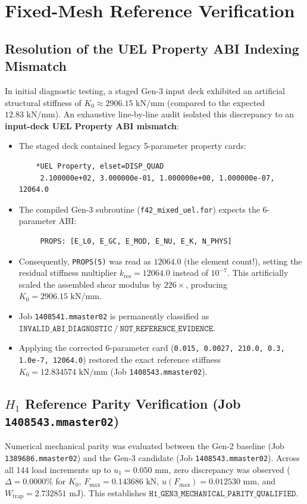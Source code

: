 \documentclass[11pt,a4paper]{article}
\begin{document}
\section{Fixed-Mesh Reference Verification}

\subsection{Resolution of the UEL Property ABI Indexing Mismatch}
In initial diagnostic testing, a staged Gen-3 input deck exhibited an artificial structural stiffness of $K_0 \approx 2906.15\text{ kN/mm}$ (compared to the expected $12.83\text{ kN/mm}$). An exhaustive line-by-line audit isolated this discrepancy to an \textbf{input-deck UEL Property ABI mismatch}:
\begin{itemize}[leftmargin=*]
    \item The staged deck contained legacy 5-parameter property cards:
    \begin{verbatim}
    *UEL Property, elset=DISP_QUAD
     2.100000e+02, 3.000000e-01, 1.000000e+00, 1.000000e-07, 12064.0
    \end{verbatim}
    \item The compiled Gen-3 subroutine (\texttt{f42\_mixed\_uel.for}) expects the 6-parameter ABI:
    \begin{verbatim}
     PROPS: [E_L0, E_GC, E_MOD, E_NU, E_K, N_PHYS]
    \end{verbatim}
    \item Consequently, \texttt{PROPS(5)} was read as $12064.0$ (the element count!), setting the residual stiffness multiplier $k_{\mathrm{res}} = 12064.0$ instead of $10^{-7}$. This artificially scaled the assembled shear modulus by $226\times$, producing $K_0 = 2906.15\text{ kN/mm}$.
    \item Job \texttt{1408541.mmaster02} is permanently classified as $\mathtt{INVALID\_ABI\_DIAGNOSTIC\ /\ NOT\_REFERENCE\_EVIDENCE}$.
    \item Applying the corrected 6-parameter card (\texttt{0.015, 0.0027, 210.0, 0.3, 1.0e-7, 12064.0}) restored the exact reference stiffness $K_0 = 12.834574\text{ kN/mm}$ (Job \texttt{1408543.mmaster02}).
\end{itemize}

\subsection{\texorpdfstring{$H_1$}{H1} Reference Parity Verification (Job \texttt{1408543.mmaster02})}
Numerical mechanical parity was evaluated between the Gen-2 baseline (Job \texttt{1389686.mmaster02}) and the Gen-3 candidate (Job \texttt{1408543.mmaster02}). Across all 144 load increments up to $u_1 = 0.050\text{ mm}$, zero discrepancy was observed ($\Delta = 0.0000\%$ for $K_0$, $F_{\max} = 0.143686\text{ kN}$, $u(F_{\max}) = 0.012530\text{ mm}$, and $W_{\mathrm{trap}} = 2.732851\text{ mJ}$). This establishes $\mathtt{H1\_GEN3\_MECHANICAL\_PARITY\_QUALIFIED}$.
\end{document}
